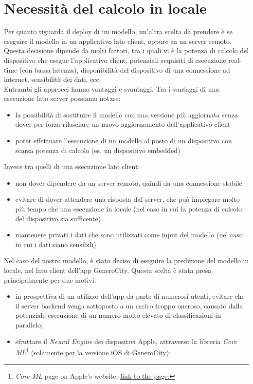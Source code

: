 \section{Necessità del calcolo in locale}

Per quanto riguarda il deploy di un modello, un'altra scelta da prendere è se 
eseguire il modello in un applicativo lato client, oppure su un server remoto.
Questa decisione dipende da molti fattori, tra i quali vi è la potenza di calcolo
del dispositivo che esegue l'applicativo client, potenziali requisiti di esecuzione
real-time (con bassa latenza), disponibilità del dispositivo di una connessione 
ad internet, sensibilità dei dati, ecc.\\
Entrambi gli approcci hanno vantaggi e svantaggi. Tra i vantaggi di una
 esecuzione lato server possiamo notare: 
\begin{itemize}
    \item la possibilità di sostituire il modello con una versione più aggiornata
    senza dover per forza rilasciare un nuovo aggiornamento dell'applicativo client
    \item poter effettuare l'esecuzione di un modello al posto di un dispositivo
   	con scarsa potenza di calcolo (es. un dispositivo embedded) \cite{computation_offloading_ml}
\end{itemize}
Invece tra quelli di una esecuzione lato client:
\begin{itemize}
    \item non dover dipendere da un server remoto, quindi da una connessione 
    stabile 
    \item evitare di dover attendere una risposta dal server, che può impiegare
    molto più tempo che una esecuzione in locale (nel caso in cui la potenza di
    calcolo del dispositivo sia sufficente)
    \item mantenere privati i dati che sono utilizzati come input del modello
    (nel caso in cui i dati siano sensibili)
\end{itemize}
Nel caso del nostro modello, è stato deciso di eseguire la predizione del modello
in locale, nel lato client dell'app GeneroCity. Questa scelta è stata presa 
principalmente per due motivi:
\begin{itemize}
    \item in prospettiva di un utilizzo dell'app da parte di numerosi utenti,
    evitare che il server backend venga sottoposto a un carico troppo oneroso,
    causato dalla potenziale esecuzione di un numero molto elevato di 
    classificazioni in parallelo;
    \item sfruttare il \emph{Neural Engine} \cite{mobile_machine_learning_arm} dei 
    dispositivi Apple, attraverso la libreria \emph{Core ML}\footnote{
    \emph{Core ML} page on Apple's website: 
    \href{https://developer.apple.com/documentation/coreml}{\underline{link to the page.}}} 
    \cite{introduction_core_ml} (solamente per la versione iOS di GeneroCity);
\end{itemize}

